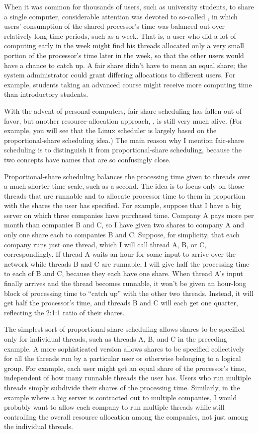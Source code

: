When it was common for thousands of users, such as university
students, to share a single computer, considerable attention was
devoted to so-called , in which users'
consumption of the shared processor's time was balanced out over
relatively long time periods, such as a week.  That is, a user who did
a lot of computing early in the week might find his threads allocated
only a very small portion of the processor's time later in the week,
so that the other users would have a chance to catch up.
A fair share didn't have to mean an equal share; the system
administrator could grant differing allocations to different users.
For example, students taking an advanced course might receive more computing
time than introductory students.

With the advent of personal computers, fair-share scheduling has
fallen out of favor, but another resource-allocation approach,
, is still very much alive. (For example,
you will see that the Linux scheduler is largely based on the
proportional-share scheduling idea.)  The main reason why I mention
fair-share scheduling is to distinguish it from proportional-share
scheduling, because the two concepts have names that are so
confusingly close.

Proportional-share scheduling balances the processing time given to
threads over a much shorter time scale, such as a second.  The idea is
to focus only on those threads that are runnable and to allocate
processor time to them in proportion with the shares the user has
specified.  For example, suppose that I have a big server on which
three companies have purchased time.  Company A pays more per month
than companies B and C, so I have given two shares to company A and
only one share each to companies B and C.  Suppose, for simplicity,
that each company runs just one thread, which I will call thread A,
B, or C, correspondingly.  If thread A waits an hour for some input to
arrive over the network while threads B and C are runnable, I will
give half the processing time to each of B and C, because they each have
one share.  When thread A's input finally arrives and the thread
becomes runnable, it won't be given an hour-long block of processing
time to ``catch up'' with the other two threads.  Instead, it will get
half the processor's time, and threads B and C will each get one
quarter, reflecting the 2:1:1 ratio of their shares.

The simplest sort of proportional-share scheduling
allows shares to be specified only for individual threads,
such as threads A, B, and C in the preceding example.
A more sophisticated version
allows shares to be specified collectively for all the threads run by
a particular user or otherwise belonging to a logical group.  For
example, each user might get an equal share of the
processor's time, independent of how many runnable threads the user
has.  Users who run multiple threads simply subdivide their shares of
the processing time.  Similarly, in the example where a big server is
contracted out to multiple companies, I would probably want to allow
each company to run multiple threads while still controlling the
overall resource allocation among the companies, not just among the
individual threads.

